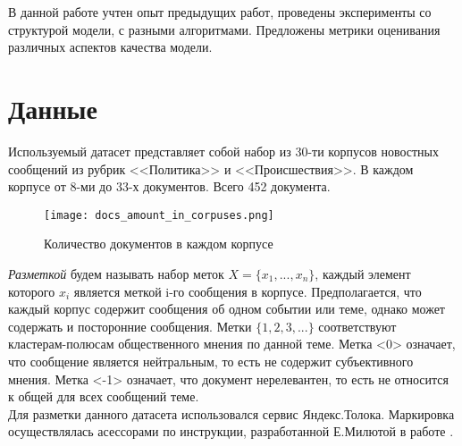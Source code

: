 \documentclass{article}
\begin{document}
В данной работе учтен опыт предыдущих работ, проведены эксперименты со структурой модели, с разными алгоритмами. Предложены метрики оценивания различных аспектов качества модели. 


\section{Данные}
Используемый датасет представляет собой набор из 30-ти корпусов новостных сообщений из рубрик <<Политика>> и <<Происшествия>>. В каждом корпусе от 8-ми до 33-х документов. Всего 452 документа.\\
\begin{figure}[!htb]
\center
    \texttt{[image: docs\_amount\_in\_corpuses.png]}
    \caption{Количество документов в каждом корпусе}
\end{figure}
\textit{Разметкой} будем называть набор меток $X=\{x_1,...,x_n\}$, каждый элемент которого $x_i$ является меткой i-го сообщения в корпусе. Предполагается, что каждый корпус содержит сообщения об одном событии или теме, однако может содержать и посторонние сообщения. Метки $\{1,2,3,...\}$ соответствуют кластерам-полюсам общественного мнения по данной теме. Метка <0> означает, что сообщение является нейтральным, то есть не содержит субъективного мнения. Метка <-1> означает, что документ нерелевантен, то есть не относится к общей для всех сообщений теме.\\

Для разметки данного датасета использовался сервис Яндекс.Толока. Маркировка осуществлялась асессорами по инструкции, разработанной Е.Милютой в работе  \cite{litlink1}.\\
\end{document}

